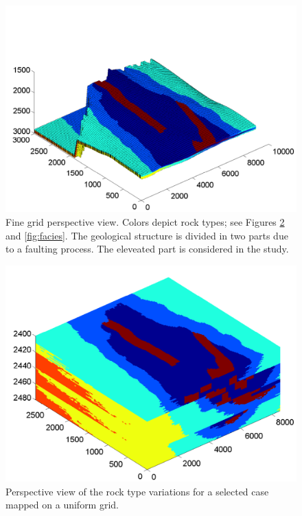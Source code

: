 \begin{figure}
\includegraphics[width=0.8\linewidth,natwidth=555bp,natheight=395bp]{./figurer/fineSat_Perspective_actual.pdf}
\caption{Fine grid perspective view. Colors depict rock types; see Figures \ref{fig:finUnf} and \ref{fig:facies}. The geological structure is divided in two parts due to a faulting process. The eleveated part is considered in the study.}
\label{fig:finAct}
\end{figure}

\begin{figure}
\includegraphics[width=0.8 \linewidth,natwidth=532bp,natheight=396bp]{./figurer/fineSat_Perspective_uniform.pdf}
\caption{Perspective view of the rock type variations for a selected case mapped on a uniform grid.}
\label{fig:finUnf}
\end{figure}

